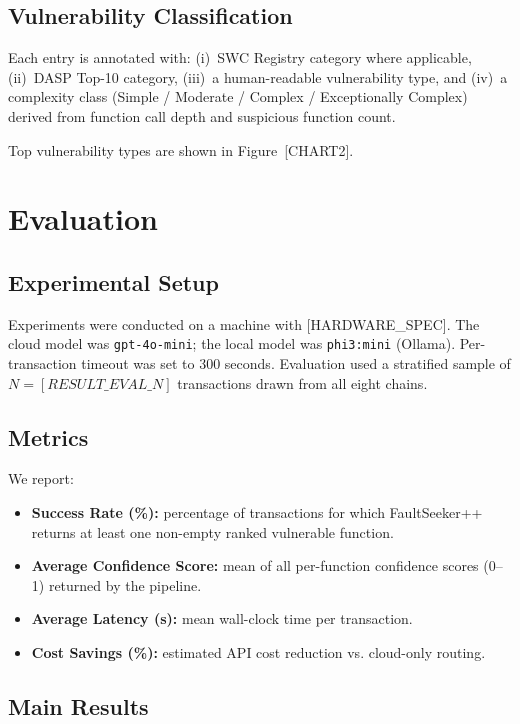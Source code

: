 \documentclass[conference]{IEEEtran}
\begin{document}
\subsection{Vulnerability Classification}

Each entry is annotated with:
(i)~SWC Registry category where applicable,
(ii)~DASP Top-10 category,
(iii)~a human-readable vulnerability type, and
(iv)~a complexity class (Simple / Moderate / Complex /
Exceptionally Complex) derived from function call depth and
suspicious function count.

Top vulnerability types are shown in Figure~[CHART2].


\section{Evaluation}
\label{sec:evaluation}

\subsection{Experimental Setup}

Experiments were conducted on a machine with [HARDWARE\_SPEC].
The cloud model was \texttt{gpt-4o-mini}; the local model was
\texttt{phi3:mini} (Ollama).
Per-transaction timeout was set to 300 seconds.
Evaluation used a stratified sample of $N=[RESULT\_EVAL\_N]$ transactions
drawn from all eight chains.

\subsection{Metrics}

We report:
\begin{itemize}
  \item \textbf{Success Rate (\%):} percentage of transactions for which
        FaultSeeker++ returns at least one non-empty ranked vulnerable
        function.
  \item \textbf{Average Confidence Score:} mean of all per-function
        confidence scores (0--1) returned by the pipeline.
  \item \textbf{Average Latency (s):} mean wall-clock time per
        transaction.
  \item \textbf{Cost Savings (\%):} estimated API cost reduction vs.
        cloud-only routing.
\end{itemize}

\subsection{Main Results}
\end{document}

